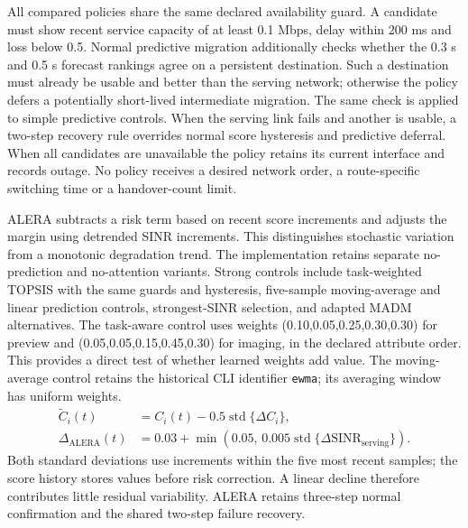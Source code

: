 \documentclass[preprint,12pt]{elsarticle}
\begin{document}
All compared policies share the same declared availability guard. A candidate must show recent service capacity of at least 0.1 Mbps, delay within 200 ms and loss below 0.5. Normal predictive migration additionally checks whether the 0.3 s and 0.5 s forecast rankings agree on a persistent destination. Such a destination must already be usable and better than the serving network; otherwise the policy defers a potentially short-lived intermediate migration. The same check is applied to simple predictive controls. When the serving link fails and another is usable, a two-step recovery rule overrides normal score hysteresis and predictive deferral. When all candidates are unavailable the policy retains its current interface and records outage. No policy receives a desired network order, a route-specific switching time or a handover-count limit.

ALERA subtracts a risk term based on recent score increments and adjusts the margin using detrended SINR increments. This distinguishes stochastic variation from a monotonic degradation trend. The implementation retains separate no-prediction and no-attention variants. Strong controls include task-weighted TOPSIS with the same guards and hysteresis, five-sample moving-average and linear prediction controls, strongest-SINR selection, and adapted MADM alternatives. The task-aware control uses weights (0.10,0.05,0.25,0.30,0.30) for preview and (0.05,0.05,0.15,0.45,0.30) for imaging, in the declared attribute order. This provides a direct test of whether learned weights add value. The moving-average control retains the historical CLI identifier \texttt{ewma}; its averaging window has uniform weights.
\begin{align}
\widetilde C_i(t)&=C_i(t)-0.5\operatorname{std}\{\Delta C_i\},\\
\Delta_{\mathrm{ALERA}}(t)&=0.03+
\min\left(0.05,\,0.005\operatorname{std}\{\Delta\mathrm{SINR}_{\mathrm{serving}}\}\right).
\end{align}
Both standard deviations use increments within the five most recent samples; the score history stores values before risk correction. A linear decline therefore contributes little residual variability. ALERA retains three-step normal confirmation and the shared two-step failure recovery.
\end{document}
